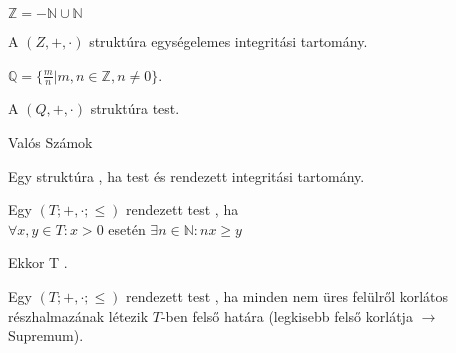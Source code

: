 \begin{frame}
\begin{tcolorbox}[title={Def.: Egész számok}]
  $\mathbb{Z} = -\mathbb{N} \cup \mathbb{N}$
\end{tcolorbox}

\begin{tcolorbox}[title={Ész}]
  A $(Z, +, {\cdot})$ struktúra egységelemes integritási tartomány.
\end{tcolorbox}

\begin{tcolorbox}[title={Def.: Racionális számok}]
  $\mathbb{Q} = \{\frac{m}{n} | m,n \in \mathbb{Z}, n \neq 0 \}$.
\end{tcolorbox}

\begin{tcolorbox}[title={Ész}]
  A $(Q, +, {\cdot})$ struktúra test.
\end{tcolorbox}
\end{frame}

\begin{frame}
\begin{tcolorbox}
{\RHuge Valós Számok}
\end{tcolorbox}
\end{frame}

\begin{frame}
\begin{tcolorbox}[title={Def.: Rendezett test}]
  Egy struktúra , ha test és rendezett integritási tartomány.
\end{tcolorbox}

\begin{tcolorbox}[title={Def.: Arkhimédészi tulajdonság}]
  Egy $(T; +, {\cdot}; {\leq})$ rendezett test , ha\\
  ${\forall}x, y \in T : x > 0$ esetén ${\exists}n \in \mathbb{N} : nx \geq y$\\
  \msmallskip

  Ekkor T .
\end{tcolorbox}

\begin{tcolorbox}[title={Def.: Felső határ tulajdonság}]
  Egy $(T; +, {\cdot}; {\leq})$ rendezett test , ha minden nem üres felülről korlátos részhalmazának létezik $T$-ben felső határa (legkisebb felső korlátja $\rightarrow$ Supremum).
\end{tcolorbox}
\end{frame}

